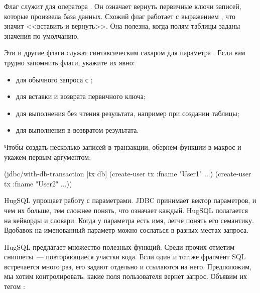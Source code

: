 Флаг  служит для оператора . Он означает вернуть первичные ключи записей, которые произвела база данных. Схожий флаг \code{:<!} работает с выражением , что значит <<вставить и вернуть>>. Она полезна, когда полям таблицы заданы значения по умолчанию.

Эти и другие флаги служат синтаксическим сахаром для параметра . Если вам трудно запомнить флаги, укажите их явно:

\begin{itemize}

\item
   для обычного запроса с ;

\item
   для вставки и возврата первичного ключа;

\item
   для выполнения без чтения результата, например при создании таблицы;

\item
   для выполнения в возвратом результата.

\end{itemize}

Чтобы создать несколько записей в транзакции, обернем функции в макрос  и укажем  первым аргументом:

\begin{english}
  \begin{clojure}
(jdbc/with-db-transaction [tx db]
  (create-user tx {:fname "User1" ...})
  (create-user tx {:fname "User2" ...}))
  \end{clojure}
\end{english}

HugSQL упрощает работу с параметрами. JDBC принимает вектор параметров, и чем их больше, тем сложнее понять, что означает каждый. HugSQL полагается на кейворды и словари. Когда у параметра есть имя, легче понять его семантику. Вдобавок на именованный параметр можно сослаться в разных местах запроса.

HugSQL предлагает множество полезных функций. Среди прочих отметим сниппеты~--- повторяющиеся участки кода. Если один и тот же фрагмент SQL встречается много раз, его задают отдельно и ссылаются на него. Предположим, мы хотим контролировать, какие поля пользователя вернет запрос. Объявим их тегом :


